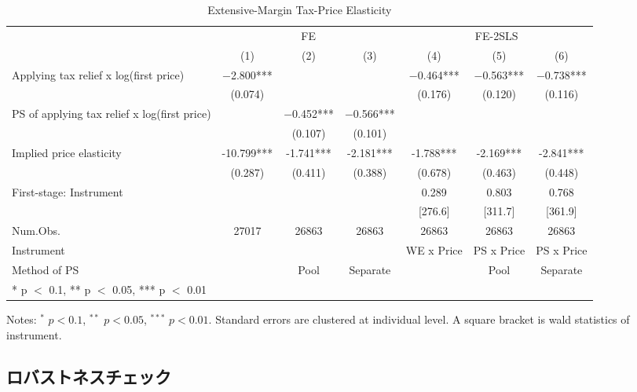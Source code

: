 \documentclass[
  11pt,
  a4paper,
]{article}
\begin{document}
\begin{table}

\caption{\label{tab:MainExtensive}Extensive-Margin Tax-Price Elasticity}
\centering
\fontsize{7}{9}\selectfont
\begin{threeparttable}
\begin{tabular}[t]{lcccccc}
\toprule
\multicolumn{1}{c}{ } & \multicolumn{3}{c}{FE} & \multicolumn{3}{c}{FE-2SLS} \\
\cmidrule(l{3pt}r{3pt}){2-4} \cmidrule(l{3pt}r{3pt}){5-7}
  & (1) & (2) & (3) & (4) & (5) & (6)\\
\midrule
Applying tax relief x log(first price) & \num{-2.800}*** &  &  & \num{-0.464}*** & \num{-0.563}*** & \num{-0.738}***\\
 & (\num{0.074}) &  &  & (\num{0.176}) & (\num{0.120}) & (\num{0.116})\\
PS of applying tax relief x log(first price) &  & \num{-0.452}*** & \num{-0.566}*** &  &  & \\
 &  & (\num{0.107}) & (\num{0.101}) &  &  & \\
\midrule
Implied price elasticity & -10.799*** & -1.741*** & -2.181*** & -1.788*** & -2.169*** & -2.841***\\
 & (0.287) & (0.411) & (0.388) & (0.678) & (0.463) & (0.448)\\
First-stage: Instrument &  &  &  & 0.289 & 0.803 & 0.768\\
 &  &  &  & {}[276.6] & {}[311.7] & {}[361.9]\\
Num.Obs. & \num{27017} & \num{26863} & \num{26863} & \num{26863} & \num{26863} & \num{26863}\\
Instrument &  &  &  & WE x Price & PS x Price & PS x Price\\
Method of PS &  & Pool & Separate &  & Pool & Separate\\
\bottomrule
\multicolumn{7}{l}{\rule{0pt}{1em}* p $<$ 0.1, ** p $<$ 0.05, *** p $<$ 0.01}\\
\end{tabular}
\begin{tablenotes}
\item Notes: $^{*}$ $p < 0.1$, $^{**}$ $p < 0.05$, $^{***}$ $p < 0.01$. Standard errors are clustered at individual level. A square bracket is wald statistics of instrument.
\end{tablenotes}
\end{threeparttable}
\end{table}

\hypertarget{ux30edux30d0ux30b9ux30c8ux30cdux30b9ux30c1ux30a7ux30c3ux30af}{%
\subsection{ロバストネスチェック}\label{ux30edux30d0ux30b9ux30c8ux30cdux30b9ux30c1ux30a7ux30c3ux30af}}
\end{document}
